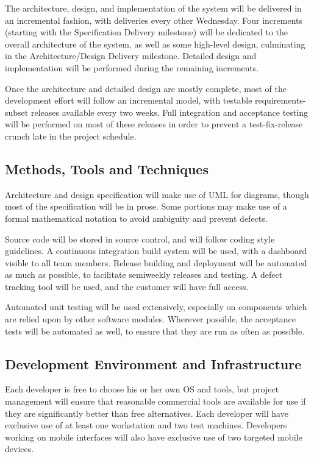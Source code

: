 \documentclass[11pt]{article}
\begin{document}
The architecture, design, and implementation of the system will be delivered in an incremental
fashion, with deliveries every other Wednesday.  Four increments (starting with the Specification
Delivery milestone) will be dedicated to the overall architecture of the system, as well as some
high-level design, culminating in the Architecture/Design Delivery milestone.  Detailed design and
implementation will be performed during the remaining increments.

Once the architecture and detailed design are mostly complete, most of the development effort will
follow an incremental model, with testable requirements-subset releases available every two weeks.
Full integration and acceptance testing will be performed on most of these releases in order to
prevent a test-fix-release crunch late in the project schedule.


\subsection{Methods, Tools and Techniques}
Architecture and design specification will make use of UML for diagrams, though most of the
specification will be in prose.  Some portions may make use of a formal mathematical notation to
avoid ambiguity and prevent defects.

Source code will be stored in source control, and will follow coding style guidelines.  A continuous
integration build system will be used, with a dashboard visible to all team members.  Release
building and deployment will be automated as much as possible, to facilitate semiweekly releases and
testing.  A defect tracking tool will be used, and the customer will have full access.

Automated unit testing will be used extensively, especially on components which are relied upon by
other software modules.  Wherever possible, the acceptance tests will be automated as well, to
ensure that they are run as often as possible.



\subsection{Development Environment and Infrastructure}
Each developer is free to choose his or her own OS and tools, but project management will ensure
that reasonable commercial tools are available for use if they are significantly better than free
alternatives.  Each developer will have exclusive use of at least one workstation and two test
machines.  Developers working on mobile interfaces will also have exclusive use of two targeted
mobile devices.
\end{document}
